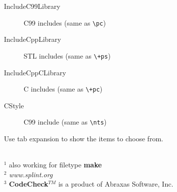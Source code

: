 \documentclass[oneside,11pt,landscape,DIV17]{scrartcl}
\begin{document}
\begin{multicols}{3}
\begin{center}
\begin{minipage}[b]{60mm}
\begin{flushleft}
\begin{description}
\item [IncludeC99Library]  C99 includes (same as \verb'\pc')
\item [IncludeCppLibrary]  STL includes (same as \verb'\+ps')
\item [IncludeCppCLibrary] C includes (same as \verb'\+pc')
\item [CStyle]             C99 include (same as \verb'\nts')
%
\end{description}
%
\scriptsize{Use tab expansion to show the items to choose from.}
%
\end{flushleft}
\scriptsize{%
\hrulefill\\
$^1$ also working for filetype \textbf{make}\\
$^2$ \textit{www.splint.org}\\
$^3$ \textbf{CodeCheck}$^{TM}$ is a product of Abraxas Software, Inc.
}%
%
\end{minipage}
%
\end{center}
\end{multicols}
\end{document}

